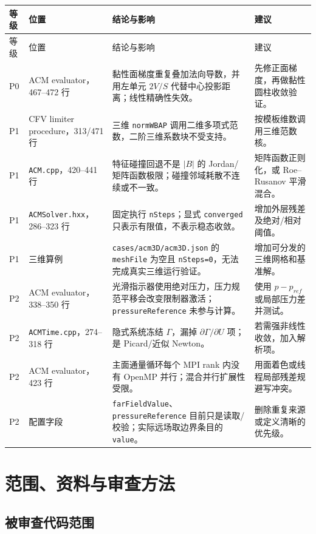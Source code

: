 \documentclass[UTF8,11pt,a4paper]{ctexart}
\newcommand{\code}[1]{\nolinkurl{#1}}
\begin{document}
\begin{longtable}{p{}p{}p{}p{}}
\toprule
等级 & 位置 & 结论与影响 & 建议\\
\midrule
\endfirsthead
\toprule
等级 & 位置 & 结论与影响 & 建议\\
\midrule
\endhead
P0 & ACM evaluator，467--472 行 & 黏性面梯度重复叠加法向导数，并用左单元 $2V/S$ 代替中心投影距离；线性精确性失效。 & 先修正面梯度，再做黏性圆柱收敛验证。\\
P1 & CFV limiter procedure，313/471 行 & 三维 \code{normWBAP} 调用二维多项式范数，二阶三维系数块不受支持。 & 按模板维数调用三维范数核。\\
P1 & \code{ACM.cpp}，420--441 行 & 特征碰撞回退不是 $|B|$ 的 Jordan/矩阵函数极限；碰撞邻域耗散不连续或不一致。 & 矩阵函数正则化，或 Roe--Rusanov 平滑混合。\\
P1 & \code{ACMSolver.hxx}，286--323 行 & 固定执行 \code{nSteps}；显式 \code{converged} 只表示有限值，不表示稳态收敛。 & 增加外层残差及绝对/相对阈值。\\
P1 & 三维算例 & \code{cases/acm3D/acm3D.json} 的 \code{meshFile} 为空且 \code{nSteps=0}，无法完成真实三维运行验证。 & 增加可分发的三维网格和基准解。\\
P2 & ACM evaluator，338--350 行 & 光滑指示器使用绝对压力，压力规范平移会改变限制器激活；\code{pressureReference} 未参与计算。 & 使用 $p-p_{ref}$ 或局部压力差并测试。\\
P2 & \code{ACMTime.cpp}，274--318 行 & 隐式系统冻结 $\Gamma$，漏掉 $\partial\Gamma/\partial U$ 项；是 Picard/近似 Newton。 & 若需强非线性收敛，加入解析项。\\
P2 & ACM evaluator，423 行 & 主面通量循环每个 MPI rank 内没有 OpenMP 并行；混合并行扩展性受限。 & 用面着色或线程局部残差规避写冲突。\\
P2 & 配置字段 & \code{farFieldValue}、\code{pressureReference} 目前只是读取/校验；实际远场取边界条目的 \code{value}。 & 删除重复来源或定义清晰的优先级。\\
\bottomrule
\end{longtable}

\section{范围、资料与审查方法}

\subsection{被审查代码范围}
\end{document}
